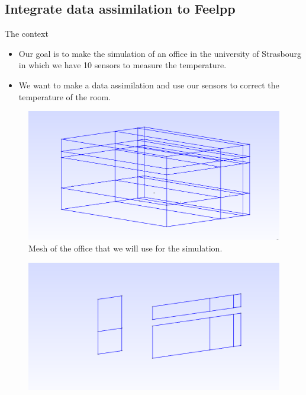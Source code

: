 \subsection{Integrate data assimilation to Feelpp}
\begin{frame}[allowframebreaks]{The context}
\begin{itemize}
    \item Our goal is to make the simulation of an office in the university of Strasbourg in which we have 10 sensors to measure the temperature.\\
    \item We want to make a data assimilation and use our sensors to correct the temperature of the room.
\end{itemize}

\begin{minipage}{0.48\linewidth}
    \begin{figure}
        \centering
        \includegraphics[width=\linewidth]{"images/enkf/Maillage_1.jpg"}
        \caption{Mesh of the office that we will use for the simulation.}
    \end{figure}
\end{minipage} \;
\begin{minipage}{0.48\linewidth}
    \begin{figure}
        \centering
        \includegraphics[width=\linewidth]{"images/enkf/Maillage_2.jpg"}

\end{figure}
\end{minipage}
\end{frame}
